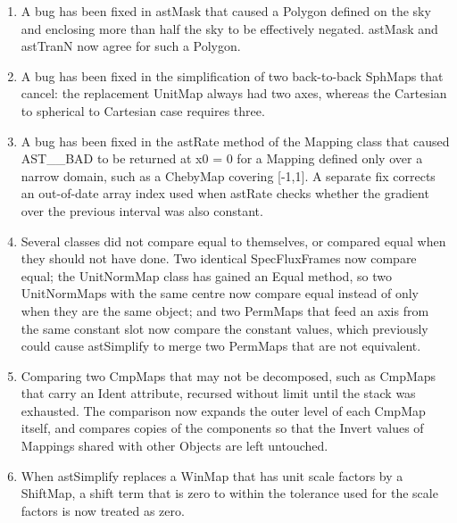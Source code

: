 \documentclass[twoside,11pt]{starlink}
\begin{document}
\begin{enumerate}
  Also fixed are a null pointer dereference and several buffer overruns and memory leaks (in PCFromStore, in WATCoeffs when reading TNX Chebyshev headers, on error paths, and when reading ill-conditioned headers), an out-of-bounds read when scaling the inverse coefficients of a PolyMap on the SIP write path, a null pointer dereference when a non-linear Mapping was written with a FitsTol too tight for the linear fit to succeed, use of the input rather than the output axis count when writing SIP keywords for a non-square Mapping, and double application of the spectral unit factor to CDELT when writing FITS-CLASS.
\item A bug has been fixed in astMask that caused a Polygon defined on the sky and enclosing more than half the sky to be effectively negated.
  astMask and astTranN now agree for such a Polygon.
\item A bug has been fixed in the simplification of two back-to-back SphMaps that cancel: the replacement UnitMap always had two axes, whereas the Cartesian to spherical to Cartesian case requires three.
\item A bug has been fixed in the astRate method of the Mapping class that caused AST\_\_BAD to be returned at x0 = 0 for a Mapping defined only over a narrow domain, such as a ChebyMap covering [-1,1].
  A separate fix corrects an out-of-date array index used when astRate checks whether the gradient over the previous interval was also constant.
\item Several classes did not compare equal to themselves, or compared equal when they should not have done.
  Two identical SpecFluxFrames now compare equal; the UnitNormMap class has gained an Equal method, so two UnitNormMaps with the same centre now compare equal instead of only when they are the same object; and two PermMaps that feed an axis from the same constant slot now compare the constant values, which previously could cause astSimplify to merge two PermMaps that are not equivalent.
\item Comparing two CmpMaps that may not be decomposed, such as CmpMaps that carry an Ident attribute, recursed without limit until the stack was exhausted.
  The comparison now expands the outer level of each CmpMap itself, and compares copies of the components so that the Invert values of Mappings shared with other Objects are left untouched.
\item When astSimplify replaces a WinMap that has unit scale factors by a ShiftMap, a shift term that is zero to within the tolerance used for the scale factors is now treated as zero.

\end{enumerate}
\end{document}
